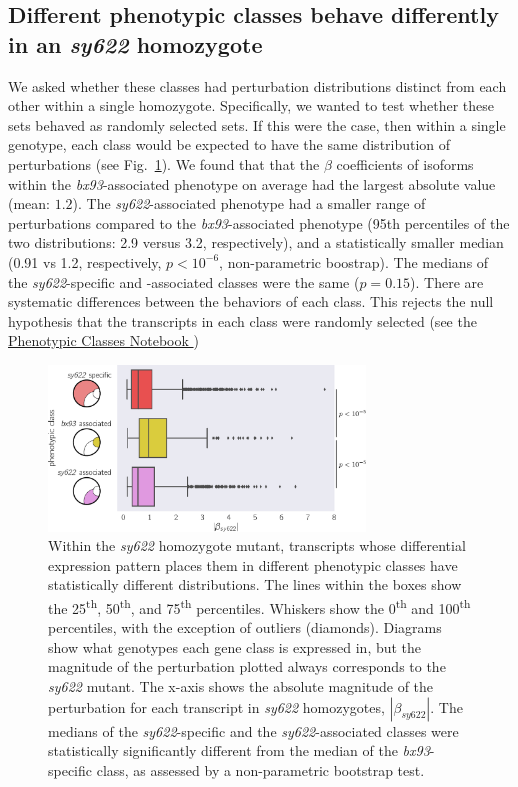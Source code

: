 \documentclass[10pt, twocolumn]{article}
\begin{document}
\subsection*{Different phenotypic classes behave differently in an
            \emph{sy622} homozygote}
We asked whether these classes had perturbation distributions distinct from each
other within a single homozygote. Specifically, we wanted to test whether these
sets behaved as randomly selected sets. If this were the case, then within a
single genotype, each class would be expected to have the same distribution of
perturbations (see Fig.~\ref{fig:classes}). We found that that the $\beta$
coefficients of isoforms within the \emph{bx93}-associated phenotype on average
had the largest absolute value (mean: $1.2$). The \emph{sy622}-associated
phenotype had a smaller range of perturbations compared to the
\emph{bx93}-associated phenotype (95th percentiles of the two distributions: 2.9
versus 3.2, respectively), and a statistically smaller median (0.91 vs 1.2,
respectively, $p < 10^{-6}$, non-parametric boostrap). The medians of the
\emph{sy622}-specific and -associated classes were the same ($p=0.15$). There
are systematic differences between the behaviors of each class. This rejects the
null hypothesis that the transcripts in each class were randomly selected
(see the
\href{https://wormlabcaltech.github.io/med-cafe/notebook/phenotypic_classes.html}{
Phenotypic Classes Notebook
})

\begin{figure}
  \centering{}
  \includegraphics[width=0.75\textwidth]{../figs/dpy22_classes.pdf}
  \caption{
    Within the \emph{sy622} homozygote mutant, transcripts whose differential
    expression pattern places them in different phenotypic classes have
    statistically different distributions. The lines within the boxes show the
    25\textsuperscript{th}, 50\textsuperscript{th}, and 75\textsuperscript{th}
    percentiles. Whiskers show the 0\textsuperscript{th} and
    100\textsuperscript{th} percentiles, with the exception of outliers
    (diamonds). Diagrams show what genotypes each gene class is expressed in,
    but the magnitude of the perturbation plotted always corresponds to the
    \emph{sy622} mutant. The x-axis shows the absolute magnitude of the
    perturbation for each transcript in \emph{sy622} homozygotes,
    $|\beta_{sy622}|$. The medians of the \emph{sy622}-specific and the
    \emph{sy622}-associated classes were statistically significantly different
    from the median of the \emph{bx93}-specific class, as assessed by a
    non-parametric bootstrap test.
  }
\label{fig:classes}
\end{figure}
\end{document}
